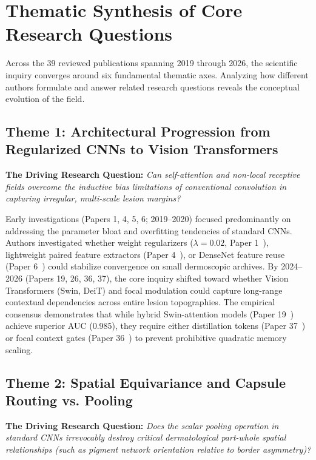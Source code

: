 \section{Thematic Synthesis of Core Research Questions}
\label{sec:thematic_synthesis}

Across the 39 reviewed publications spanning 2019 through 2026, the scientific inquiry converges around six fundamental thematic axes. Analyzing how different authors formulate and answer related research questions reveals the conceptual evolution of the field.

\subsection{Theme 1: Architectural Progression from Regularized CNNs to Vision Transformers}
\textbf{The Driving Research Question:} \textit{Can self-attention and non-local receptive fields overcome the inductive bias limitations of conventional convolution in capturing irregular, multi-scale lesion margins?}

Early investigations (Papers 1, 4, 5, 6; 2019--2020) focused predominantly on addressing the parameter bloat and overfitting tendencies of standard CNNs. Authors investigated whether weight regularizers ($\lambda = 0.02$, Paper 1~\cite{8669763}), lightweight paired feature extractors (Paper 4~\cite{9099799}), or DenseNet feature reuse (Paper 6~\cite{9167192}) could stabilize convergence on small dermoscopic archives. By 2024--2026 (Papers 19, 26, 36, 37), the core inquiry shifted toward whether Vision Transformers (Swin, DeiT) and focal modulation could capture long-range contextual dependencies across entire lesion topographies. The empirical consensus demonstrates that while hybrid Swin-attention models (Paper 19~\cite{10731679}) achieve superior AUC (0.985), they require either distillation tokens (Paper 37~\cite{11641552}) or focal context gates (Paper 36~\cite{11435372}) to prevent prohibitive quadratic memory scaling.

\subsection{Theme 2: Spatial Equivariance and Capsule Routing vs. Pooling}
\textbf{The Driving Research Question:} \textit{Does the scalar pooling operation in standard CNNs irrevocably destroy critical dermatological part-whole spatial relationships (such as pigment network orientation relative to border asymmetry)?}

